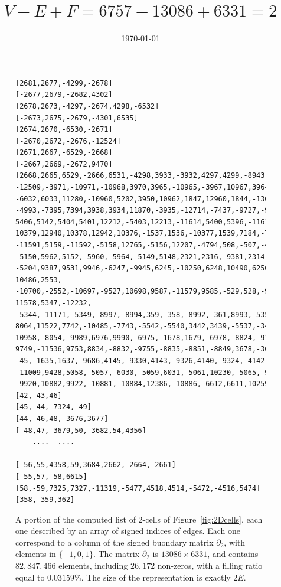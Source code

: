 \documentclass[11pt, oneside]{article}   	%
\title{$V-E+F=6757 - 13086 + 6331 = 2$}
\author{\today}
\date{}							%
\begin{document}
\maketitle



\begin{figure}[htbp] %
   \centering
   \begin{minipage}[c]{0.8\textwidth}
{\scriptsize
\begin{verbatim}
[2681,2677,-4299,-2678]
[-2677,2679,-2682,4302]
[2678,2673,-4297,-2674,4298,-6532]
[-2673,2675,-2679,-4301,6535]
[2674,2670,-6530,-2671]
[-2670,2672,-2676,-12524]
[2671,2667,-6529,-2668]
[-2667,2669,-2672,9470]
[2668,2665,6529,-2666,6531,-4298,3933,-3932,4297,4299,-8943,5803,2741,-2740,5804,-2743, 
-12509,-3971,-10971,-10968,3970,3965,-10965,-3967,10967,3964,-10964,3959,-10806,-3960, 
-6032,6033,11280,-10960,5202,3950,10962,1847,12960,1844,-13048,-1846,-12949,-4992,12948, 
-4993,-7395,7394,3938,3934,11870,-3935,-12714,-7437,-9727,-9725,10566,-5141,5408,5139,
5406,5142,5404,5401,12212,-5403,12213,-11614,5400,5396,-11612,4398,-11609,-4399,11610,
10379,12940,10378,12942,10376,-1537,1536,-10377,1539,7184,-7183,-2362,-2358,-11590,2359,
-11591,5159,-11592,-5158,12765,-5156,12207,-4794,508,-507,-4790,-3322,4791,-3324,-5153,
-5150,5962,5152,-5960,-5964,-5149,5148,2321,2316,-9381,2314,9380,2312,9383,-2313,9385,
-5204,9387,9531,9946,-6247,-9945,6245,-10250,6248,10490,6250,-10491,-6733,10489,6734,
10486,2553, -10700,-2552,-10697,-9527,10698,9587,-11579,9585,-529,528,-9586,11545,
11578,5347,-12232, -5344,-11171,-5349,-8997,-8994,359,-358,-8992,-361,8993,-5350,-11520,
8064,11522,7742,-10485,-7743,-5542,-5540,3442,3439,-5537,-3441,5539,8056,-10959,8053,
10958,-8054,-9989,6976,9990,-6975,-1678,1679,-6978,-8824,-9101,-8826,9100,-8829,-9750,
9749,-11536,9753,8834,-8832,-9755,-8835,-8851,-8849,3678,-3677,-4716,-4713,43,-42,-1638,
-45,-1635,1637,-9686,4145,-9330,4143,-9326,4140,-9324,-4142,9325,-1535,11008,1534,
-11009,9428,5058,-5057,-6030,-5059,6031,-5061,10230,-5065,-9925,-8561,12422,8560,-12421,
-9920,10882,9922,-10881,-10884,12386,-10886,-6612,6611,10259,-10260,-4643,4641,8047,4644]
[42,-43,46]
[45,-44,-7324,-49]
[44,-46,48,-3676,3677]
[-48,47,-3679,50,-3682,54,4356]
	....  ....

[-56,55,4358,59,3684,2662,-2664,-2661]
[-55,57,-58,6615]
[58,-59,7325,7327,-11319,-5477,4518,4514,-5472,-4516,5474]
[358,-359,362]
\end{verbatim}}
\end{minipage}
   \caption{A portion of the computed list of 2-cells of Figure~\ref{fig:2Dcells}, each one described by an array of signed indices of edges. Each one correspond to a column of the signed buondary matrix $\partial_2$, with elements in $\{-1,0,1\}$. The matrix $\partial_2$ is $13086 \times 6331$, and contains $82,\!847,\!466$ elements, including $26,\!172$ non-zeros, with a filling ratio equal to $0.03159\%$. The size of the representation is exactly $2E$.}
   \label{fig:example}
\end{figure}
\end{document}
